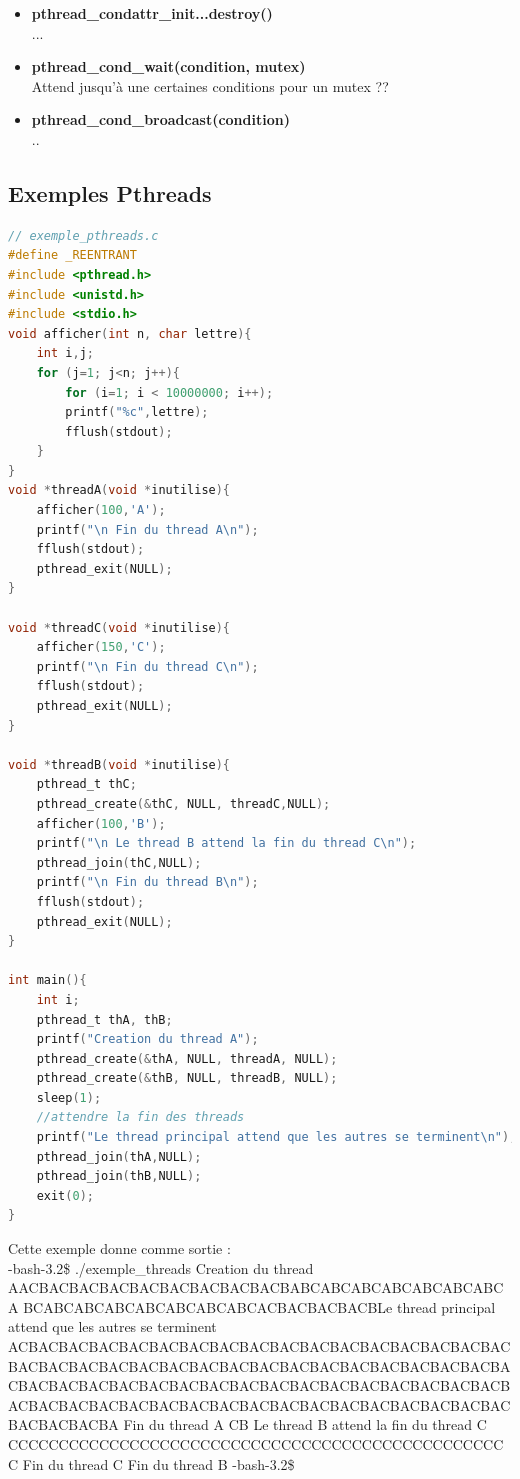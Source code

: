 \documentclass[oneside]{book}
\begin{document}
\begin{itemize}
Détruit..

\item \textbf{pthread\_condattr\_init...destroy()}\\

...

\item \textbf{pthread\_cond\_wait(condition, mutex)}\\

Attend jusqu'à une certaines conditions pour un mutex ??

\item \textbf{pthread\_cond\_broadcast(condition)}\\

..
\end{itemize}

\subsection{Exemples Pthreads}

\begin{lstlisting}[language=C]
// exemple_pthreads.c
#define _REENTRANT
#include <pthread.h>
#include <unistd.h>
#include <stdio.h>
void afficher(int n, char lettre){
	int i,j;
	for (j=1; j<n; j++){
		for (i=1; i < 10000000; i++);
		printf("%c",lettre);
		fflush(stdout);
	}
}
void *threadA(void *inutilise){
	afficher(100,'A');
	printf("\n Fin du thread A\n");
	fflush(stdout);
	pthread_exit(NULL);
}

void *threadC(void *inutilise){
	afficher(150,'C');
	printf("\n Fin du thread C\n");
	fflush(stdout);
	pthread_exit(NULL);
}

void *threadB(void *inutilise){
	pthread_t thC;
	pthread_create(&thC, NULL, threadC,NULL);
	afficher(100,'B');
	printf("\n Le thread B attend la fin du thread C\n");
	pthread_join(thC,NULL);
	printf("\n Fin du thread B\n");
	fflush(stdout);
	pthread_exit(NULL);
}

int main(){
	int i;
	pthread_t thA, thB;
	printf("Creation du thread A");
	pthread_create(&thA, NULL, threadA, NULL);
	pthread_create(&thB, NULL, threadB, NULL);
	sleep(1);
	//attendre la fin des threads
	printf("Le thread principal attend que les autres se terminent\n");
	pthread_join(thA,NULL);
	pthread_join(thB,NULL);
	exit(0);
}
\end{lstlisting}
Cette exemple donne comme sortie : \\

-bash-3.2\$ ./exemple\_threads
Creation du thread
AACBACBACBACBACBACBACBACBACBABCABCABCABCABCABCABCA
BCABCABCABCABCABCABCABCACBACBACBACBLe thread principal
attend que les autres se terminent
ACBACBACBACBACBACBACBACBACBACBACBACBACBACBACBACBAC
BACBACBACBACBACBACBACBACBACBACBACBACBACBACBACBACBA
CBACBACBACBACBACBACBACBACBACBACBACBACBACBACBACBACB
ACBACBACBACBACBACBACBACBACBACBACBACBACBACBACBACBAC
BACBACBACBA
Fin du thread A
CB
Le thread B attend la fin du thread C
CCCCCCCCCCCCCCCCCCCCCCCCCCCCCCCCCCCCCCCCCCCCCCCCCC
Fin du thread C
Fin du thread B
-bash-3.2\$
\end{document}
